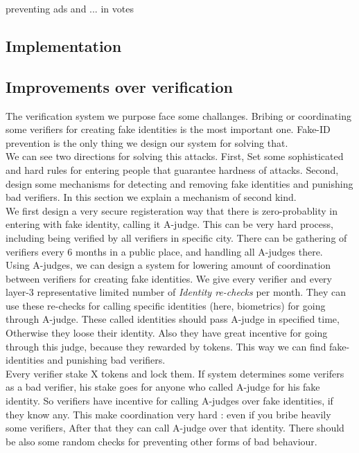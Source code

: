 \documentclass{article}
\begin{document}
 preventing ads and ... in votes\\

\subsection{Implementation}

\subsection{Improvements over verification}
The verification system we purpose face some challanges. Bribing or coordinating some verifiers for creating fake identities is the most important one. Fake-ID prevention is the only thing we design our system for solving that. \\
We can see two directions for solving this attacks. First, Set some sophisticated and hard rules for entering people that guarantee hardness of attacks. Second, design some mechanisms for detecting and removing fake identities and punishing bad verifiers. In this section we explain a mechanism of second kind. \\
We first design a very secure registeration way that there is zero-probablity in entering with fake identity, calling it A-judge. This can be very hard process, including being verified by all verifiers in specific city. There can be gathering of verifiers every 6 months in a public place, and handling all A-judges there.
\\
Using A-judges, we can design a system for lowering amount of coordination between verifiers for creating fake identities. We give every verifier and every layer-3 representative limited number of \textit{Identity re-checks} per month. They can use these re-checks for calling specific identities (here, biometrics) for 	going through A-judge. These called identities should pass A-judge in specified time, Otherwise they loose their identity. Also they have great incentive for going through this judge, because they rewarded by tokens. This way we can find fake-identities and punishing bad verifiers.
\\
Every verifier stake X tokens and lock them. If system determines some verifers as a bad verifier, his stake goes for anyone who called A-judge for his fake identity. So verifiers have incentive for calling A-judges over fake identities, if they know any. This make coordination very hard : even if you bribe heavily some verifiers, After that they can call A-judge over that identity. There should be also some random checks for preventing other forms of bad behaviour.
\end{document}
